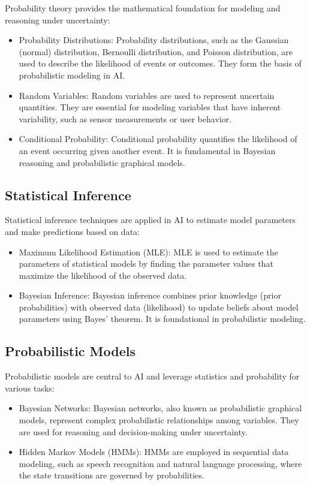\documentclass[conference]{IEEEtran}
\begin{document}
Probability theory provides the mathematical foundation for modeling and reasoning under uncertainty:
\begin{itemize}
  \item Probability Distributions: Probability distributions, such as the Gaussian (normal) distribution, Bernoulli distribution, and Poisson distribution, are used to describe the likelihood of events or outcomes. They form the basis of probabilistic modeling in AI.

  \item Random Variables: Random variables are used to represent uncertain quantities. They are essential for modeling variables that have inherent variability, such as sensor measurements or user behavior.

  \item Conditional Probability: Conditional probability quantifies the likelihood of an event occurring given another event. It is fundamental in Bayesian reasoning and probabilistic graphical models.
\end{itemize}

\subsection{Statistical Inference}

Statistical inference techniques are applied in AI to estimate model parameters and make predictions based on data:
\begin{itemize}
  \item Maximum Likelihood Estimation (MLE): MLE is used to estimate the parameters of statistical models by finding the parameter values that maximize the likelihood of the observed data.

  \item Bayesian Inference: Bayesian inference combines prior knowledge (prior probabilities) with observed data (likelihood) to update beliefs about model parameters using Bayes' theorem. It is foundational in probabilistic modeling.
\end{itemize}

\subsection{Probabilistic Models}

Probabilistic models are central to AI and leverage statistics and probability for various tasks:
\begin{itemize}
  \item Bayesian Networks: Bayesian networks, also known as probabilistic graphical models, represent complex probabilistic relationships among variables. They are used for reasoning and decision-making under uncertainty.

  \item Hidden Markov Models (HMMs): HMMs are employed in sequential data modeling, such as speech recognition and natural language processing, where the state transitions are governed by probabilities.
\end{itemize}
\end{document}
